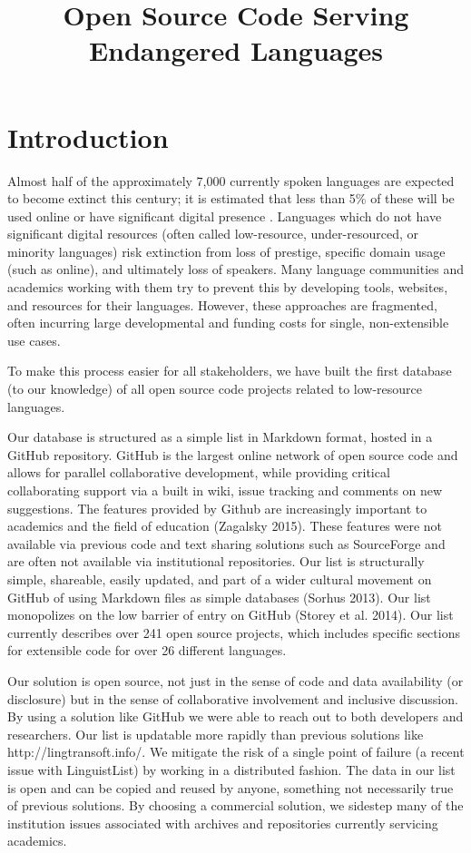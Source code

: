 \documentclass[10pt, a4paper]{article}
\title{Open Source Code Serving Endangered Languages}
\begin{document}
\maketitleabstract

\section{Introduction}

Almost half of the approximately 7,000 currently spoken languages are expected to
become extinct this century; it is estimated that less than 5\% of these will be used online or have
significant digital presence \cite{kornai2013digital}. Languages which do not have significant digital
resources (often called low-resource, under-resourced, or minority languages) risk extinction
from loss of prestige, specific domain usage (such as online), and ultimately loss of speakers.
Many language communities and academics working with them try to prevent this by developing
tools, websites, and resources for their languages. However, these approaches are fragmented,
often incurring large developmental and funding costs for single, non-extensible use cases.

To make this process easier for all stakeholders, we have built the first database (to our knowledge)
of all open source code projects related to low-resource languages.

Our database is structured as a simple list in Markdown format, hosted in a GitHub
repository. GitHub is the largest online network of open source code and allows for parallel
collaborative development, while providing critical collaborating support via a built in wiki,
issue tracking and comments on new suggestions. The features provided by Github are
increasingly important to academics and the field of education (Zagalsky 2015). These features
were not available via previous code and text sharing solutions such as SourceForge and are
often not available via institutional repositories. Our list is structurally simple, shareable, easily
updated, and part of a wider cultural movement on GitHub of using Markdown files as simple
databases (Sorhus 2013). Our list monopolizes on the low barrier of entry on GitHub (Storey et
al. 2014). Our list currently describes over 241 open source projects, which includes specific
sections for extensible code for over 26 different languages.

Our solution is open source, not just in the sense of code and data availability (or disclosure) but
in the sense of collaborative involvement and inclusive discussion. By using a solution like
GitHub we were able to reach out to both developers and researchers. Our list is updatable more
rapidly than previous solutions like http://lingtransoft.info/. We mitigate the risk of a single point
of failure (a recent issue with LinguistList) by working in a distributed fashion. The data in our
list is open and can be copied and reused by anyone, something not necessarily true of previous
solutions. By choosing a commercial solution, we sidestep many of the institution issues
associated with archives and repositories currently servicing academics.
\end{document}
